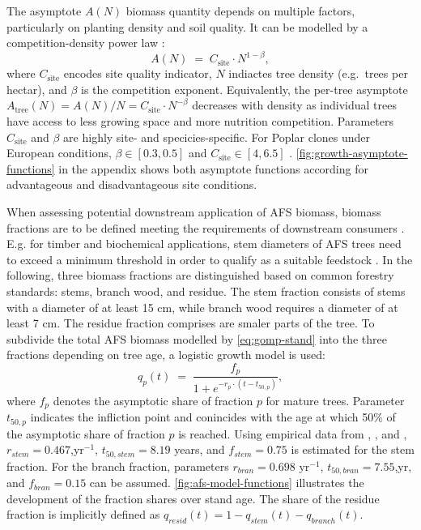\documentclass[APA,TimesLARGE]{WileyNJDv5} %
\begin{document}
The asymptote \(A(N)\) biomass quantity depends on multiple factors, particularly on planting density and soil quality. It can be modelled by a competition-density power law
\cite{Shinozaki1961_CD_Effect}:
\begin{equation}
  A(N) \;=\; C_{\mathrm{site}} \cdot N^{1-\beta},
  \label{eq:A-density}
\end{equation}
where \(C_{\mathrm{site}}\) encodes site quality indicator, \(N\) indiactes tree density (e.g.~trees per hectar), and \(\beta\) is the competition exponent. Equivalently, the per-tree asymptote \(A_{\mathrm{tree}}(N) = A(N)/N = C_{\mathrm{site}}\cdot N^{-\beta}\) decreases with density as individual trees have access to less growing space and more nutrition competition. Parameters \(C_{\mathrm{site}}\) and \(\beta\) are highly site- and specicies-specific. For Poplar clones under European conditions, \(\beta \in [0.3,0.5]\) and \(C_{\mathrm{site}} \in [4,6.5]\) \cite{Niemczyk2021_Poplar_Rotation}. \autoref{fig:growth-asymptote-functions} in the appendix shows both asymptote functions according for advantageous and disadvantageous site conditions.

When assessing potential downstream application of AFS biomass, biomass fractions are to be defined meeting the requirements of downstream consumers \cite{Petras2008Assortment}. E.g. for timber and biochemical applications, stem diameters of AFS trees need to exceed a minimum threshold in order to qualify as a suitable feedstock \cite{Zhu2011WoodSizeReduction}. In the following, three biomass fractions are distinguished based on common forestry standards: stems, branch wood, and residue. The stem fraction consists of stems with a diameter of at least 15 cm, while branch wood requires a diameter of at least 7 cm. The residue fraction comprises are smaler parts of the tree. To subdivide the total AFS biomass modelled by \eqref{eq:gomp-stand} into the three fractions depending on tree age, a logistic growth model \cite{Zeide1993_AnalysisGrowth} is used:
\begin{equation}
  q_p(t) \;=\; \frac{f_p}{1 + e^{-r_p \cdot (t - t_{50,p})}},
  \label{eq:logistic-merch}
\end{equation}
where \(f_p\) denotes the asymptotic share of fraction \(p\) for mature trees. Parameter \(t_{50,p}\) indicates the infliction point and conincides with the age at which 50\% of the asymptotic share of fraction \(p\) is reached. Using empirical data from \cite{Civitarese2019_Poplar_Harvest}, \cite{Jha2018_Poplar_AFS_Biomass}, and \cite{Niemczyk2021_Poplar_Rotation}, \(r_{stem} = 0.467\),yr\(^{-1}\), \(t_{50,stem} = 8.19\) years, and \(f_{stem} = 0.75\) is estimated for the stem fraction. For the branch fraction, parameters \(r_{bran} = 0.698\) yr\(^{-1}\), \(t_{50,bran} = 7.55\),yr, and \(f_{bran} = 0.15\) can be assumed. \autoref{fig:afs-model-functions} illustrates the development of the fraction shares over stand age. The share of the residue fraction is implicitly defined as \(q_{resid}(t) = 1 - q_{stem}(t) - q_{branch}(t)\).
\end{document}

